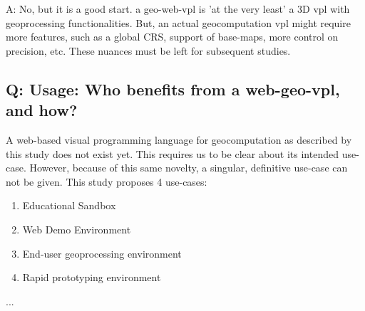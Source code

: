 A: No, but it is a good start. a geo-web-vpl is 'at the very least' a 3D vpl with geoprocessing functionalities. 
But, an actual geocomputation vpl might require more features, such as a global CRS, support of base-maps, more control on precision, etc. 
These nuances must be left for subsequent studies. 

\subsection{Q: Usage: Who benefits from a web-geo-vpl, and how? }
A web-based visual programming language for geocomputation as described by this study does not exist yet. 
This requires us to be clear about its intended use-case. 
However, because of this same novelty, a singular, definitive use-case can not be given.
This study proposes 4 use-cases:
\begin{enumerate}[-]
  \item Educational Sandbox
  \item Web Demo Environment
  \item End-user geoprocessing environment 
  \item Rapid prototyping environment
\end{enumerate}

...







